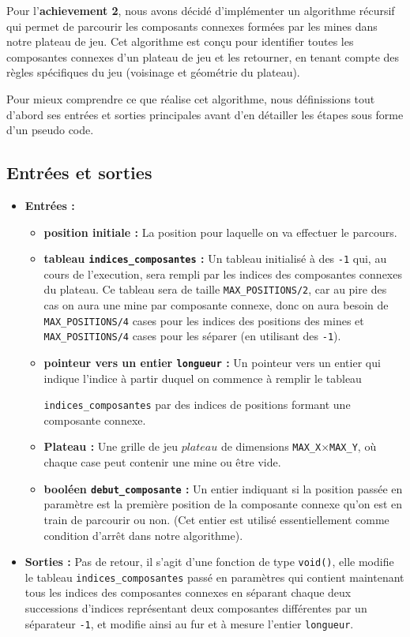\documentclass[a4paper,12pt]{report}
\begin{document}
Pour l'\textbf{achievement 2}, nous avons décidé d'implémenter un algorithme récursif qui permet de parcourir les 
composants connexes formées par les mines dans notre plateau de jeu. Cet algorithme est conçu pour identifier 
toutes les composantes connexes d'un plateau de jeu et les retourner, en tenant compte des règles spécifiques 
du jeu (voisinage et géométrie du plateau). 

Pour mieux comprendre ce que réalise cet algorithme, nous définissions tout d'abord ses entrées et sorties 
principales avant d'en détailler les étapes sous forme d'un pseudo code.

\subsection{Entrées et sorties}

\begin{itemize}
    \item \textbf{Entrées :}
    \begin{itemize}
        \item \textbf{position initiale :} La position pour laquelle on va effectuer le parcours.
        \item \textbf{tableau \texttt{indices\_composantes} :} Un tableau initialisé à des \texttt{-1} qui, au cours 
        de l'execution, sera rempli par les indices des composantes connexes du plateau. Ce tableau sera de 
        taille \texttt{MAX\_POSITIONS/2}, car au pire des cas on aura une mine par composante connexe, donc on 
        aura besoin de \texttt{MAX\_POSITIONS/4} cases pour les indices des positions des mines et \texttt{MAX\_POSITIONS/4} 
        cases pour les séparer (en utilisant des \texttt{-1}).
        \item \textbf{pointeur vers un entier \texttt{longueur} :} Un pointeur vers un entier qui indique l'indice à 
        partir duquel on commence à remplir le tableau 
        
        \texttt{indices\_composantes} par des indices de 
        positions formant une composante connexe.
        \item \textbf{Plateau :} Une grille de jeu \(plateau\) de dimensions \texttt{MAX\_X}\(\times\)\texttt{MAX\_Y}, 
        où chaque case peut contenir une mine ou être vide.
        \item \textbf{booléen \texttt{debut\_composante} :} Un entier indiquant si la position passée en paramètre 
        est la première position de la composante connexe qu'on est en train de parcourir ou non. (Cet entier 
        est utilisé essentiellement comme condition d'arrêt dans notre algorithme).
    \end{itemize}
    \item \textbf{Sorties :} Pas de retour, il s'agit d'une fonction de type \texttt{void()}, elle modifie le 
    tableau \texttt{indices\_composantes} passé en paramètres qui contient maintenant tous les indices des 
    composantes connexes en séparant chaque deux successions d'indices représentant deux composantes différentes 
    par un séparateur \texttt{-1}, et modifie ainsi au fur et à mesure l'entier \texttt{longueur}.
\end{itemize}
\end{document}
